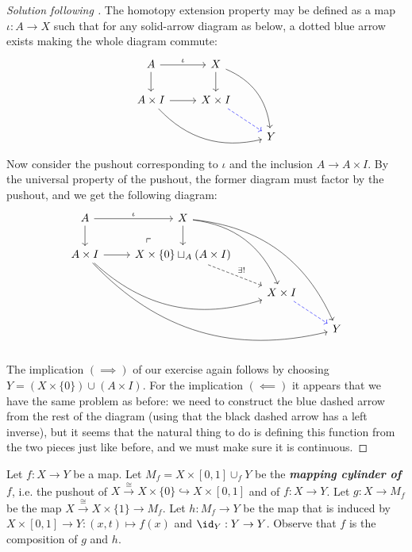 \begin{proof}[Solution following \cite{lectures}]
	The homotopy extension property may be defined as a map $\iota:A\to X$ such that for any solid-arrow diagram as below, a dotted blue arrow exists making the whole diagram commute:
	\[\begin{tikzcd}
		A\arrow[r,"\iota"]\arrow[d]&X\arrow[d]\arrow[ddr,bend left]\\
		A\times I\arrow[r]\arrow[drr,bend right]&X\times I\arrow[dr,dashed,blue]&\\
		&&Y
	\end{tikzcd}\]
	Now consider the pushout corresponding to $\iota$ and the inclusion $A\to A\times I$. By the universal property of the pushout, the former diagram must factor by the pushout, and we get the following diagram:
	\[\begin{tikzcd}
		A\arrow[r,"\iota"]\arrow[d]&X\arrow[d]\arrow[ddr,bend left]\arrow[dddrr, bend left]\\
		A\times I\arrow[r]\arrow[ddrrr,bend right]\arrow[drr,bend right]&X\times\{0\}\sqcup_A(A\times I) \arrow[dr,dashed,"\exists!"]\arrow[ul,phantom,very near start,"\ulcorner"]&\\
		&&X\times I\arrow[dr,dashed,blue]\\
		&&&Y
	\end{tikzcd}\]
	The implication $(\implies)$ of our exercise again follows by choosing $Y=(X\times\{0\})\cup(A\times I)$. For the implication $(\impliedby)$ {\color{red}it appears that we have the same problem as before}: we need to construct the blue dashed arrow from the rest of the diagram (using that the black dashed arrow has a left inverse), but it seems that the natural thing to do is defining this function from the two pieces just like before, and we must make sure it is continuous.
\end{proof}
	\begin{defn}
		Let $f:X\to Y$ be a map. Let $M_f=X\times[0,1]\cup_fY$ be the \textbf{\textit{mapping cylinder of $f$}}, i.e. the pushout of $X\overset{\cong}{\to}X\times\{0\}\hookrightarrow X\times[0,1]$ and of $f:X\to Y$.
	Let $g:X\to M_f$ be the map $X\overset{\cong}{\to}X\times\{1\}\to M_f$. Let $h:M_f\to Y$ be the map that is induced by $X\times[0,1]\to Y:(x,t)\mapsto f(x)$ and $\id_Y:Y\to Y$. Observe that $f$ is the composition of $g$ and $h$.
	\end{defn}
	
